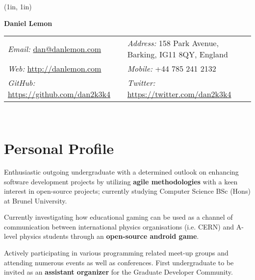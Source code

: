 \documentclass[final,a4paper,notitlepage,10pt]{report}
\makeatletter
\newcommand{\mailto}[1]{\href{mailto:#1}{#1}}
\newcommand{\name}{Daniel Lemon}
\newcommand{\addr}{158 Park Avenue, Barking, IG11 8QY, England}
\newcommand{\phone}{+44 785 241 2132}
\newcommand{\email}{\mailto{dan@danlemon.com}}
\newcommand{\website}{\href{http://danlemon.com}{http://danlemon.com}}
\newcommand{\github}{\href{https://github.com/dan2k3k4}{https://github.com/dan2k3k4}}
\newcommand{\twitter}{\href{https://twitter.com/dan2k3k4}{https://twitter.com/dan2k3k4}}
\makeatother
\begin{document}
\begin{minipage}[t]{\textwidth}
	\begin{minipage}{1in}
	\begin{pspicture}(1in, 1in)
	\end{pspicture}
	\end{minipage}\hspace{0.6cm}%
	\begin{minipage}{0.85\textwidth}
	\textbf{\LARGE \qquad \name }

	\begin{tabular*}{\textwidth}{@{} p{} l}\\
	\textit{Email:} \email\ & \textit{Address:} \addr \\
	\textit{Web:} \website\ & \textit{Mobile:} \phone \\
	\textit{GitHub:} \github\ & \textit{Twitter:} \twitter \\
	\end{tabular*}\\
	
	\end{minipage}
\end{minipage}

\section*{Personal Profile {\hfill\raisebox{.5ex}{\makebox[.65\textwidth]{\hrulefill}}}}
\begin{compactitemize}
\item Enthusiastic outgoing undergraduate with a determined outlook on enhancing software development projects by utilizing \textbf{agile methodologies} with a keen interest in open-source projects; currently studying Computer Science BSc (Hons) at Brunel University.

\item Currently investigating how educational gaming can be used as a channel of communication between international physics organisations (i.e. CERN) and A-level physics students through an \textbf{open-source android game}.

\item Actively participating in various programming related meet-up groups and attending numerous events as well as conferences. First undergraduate to be invited as an \textbf{assistant organizer} for the Graduate Developer Community.
\end{compactitemize}
\end{document}
